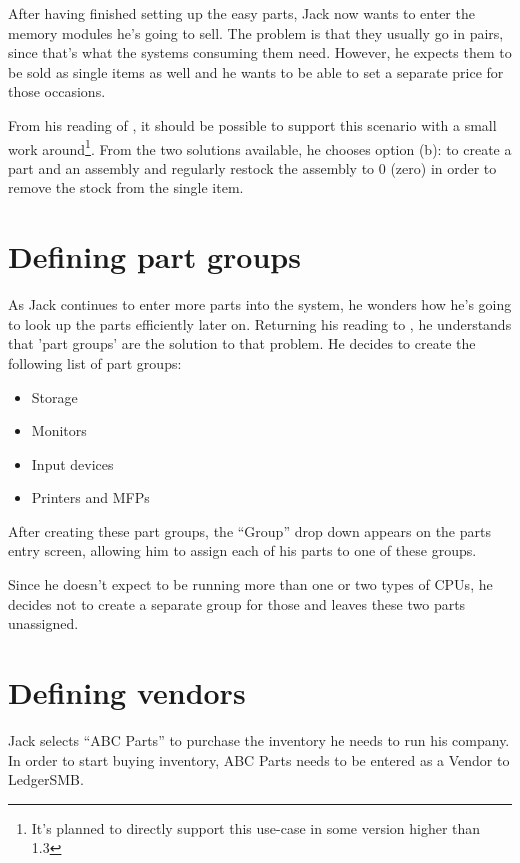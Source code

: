 After having finished setting up the easy parts, Jack now wants to enter
the memory modules he's going to sell. The problem is that they usually go in pairs,
since that's what the systems consuming them need. However, he expects them to be sold
as single items as well and he wants to be able to set a separate price for those occasions.

From his reading of , it should be
possible to support this scenario with a small work around\footnote{It's planned to directly
support this use-case in some version higher than 1.3}. From the two solutions available,
he chooses option (b): to create a part and an assembly and regularly restock the assembly
to 0 (zero) in order to remove the stock from the single item.

\section{Defining part groups}

As Jack continues to enter more parts into the system, he wonders how he's going to
look up the parts efficiently later on. Returning his reading to ,
he understands that 'part groups' are the solution to that problem. He decides to create
the following list of part groups:

\begin{itemize}
\item Storage
\item Monitors
\item Input devices
\item Printers and MFPs
\end{itemize}

After creating these part groups, the ``Group'' drop down appears on the parts entry screen,
allowing him to assign each of his parts to one of these groups.

Since he doesn't expect to be running more than one or two types of CPUs, he decides
not to create a separate group for those and leaves these two parts unassigned.

\section{Defining vendors}
\label{sec:defining-vendors}

Jack selects ``ABC Parts'' to purchase the inventory he needs to run his company. In
order to start buying inventory, ABC Parts needs to be entered as a Vendor to LedgerSMB.

